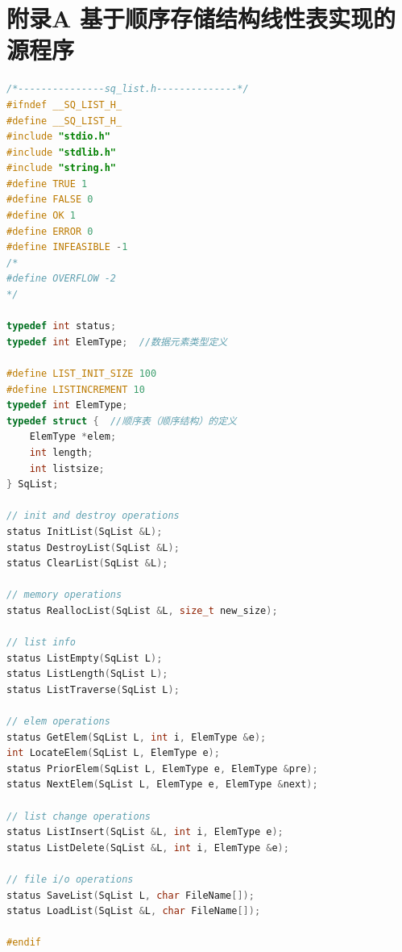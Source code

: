 \documentclass[supercite]{Experimental_Report}
\theoremstyle{definition}
\begin{document}


\appendix

\section{附录A 基于顺序存储结构线性表实现的源程序}

\begin{lstlisting}[caption={$sq\_list.h$}, language=C++, frame=single]
/*---------------sq_list.h--------------*/
#ifndef __SQ_LIST_H_
#define __SQ_LIST_H_
#include "stdio.h"
#include "stdlib.h"
#include "string.h"
#define TRUE 1
#define FALSE 0
#define OK 1
#define ERROR 0
#define INFEASIBLE -1
/*
#define OVERFLOW -2
*/

typedef int status;
typedef int ElemType;  //数据元素类型定义

#define LIST_INIT_SIZE 100
#define LISTINCREMENT 10
typedef int ElemType;
typedef struct {  //顺序表（顺序结构）的定义
    ElemType *elem;
    int length;
    int listsize;
} SqList;

// init and destroy operations
status InitList(SqList &L);
status DestroyList(SqList &L);
status ClearList(SqList &L);

// memory operations
status ReallocList(SqList &L, size_t new_size);

// list info
status ListEmpty(SqList L);
status ListLength(SqList L);
status ListTraverse(SqList L);

// elem operations
status GetElem(SqList L, int i, ElemType &e);
int LocateElem(SqList L, ElemType e);
status PriorElem(SqList L, ElemType e, ElemType &pre);
status NextElem(SqList L, ElemType e, ElemType &next);

// list change operations
status ListInsert(SqList &L, int i, ElemType e);
status ListDelete(SqList &L, int i, ElemType &e);

// file i/o operations
status SaveList(SqList L, char FileName[]);
status LoadList(SqList &L, char FileName[]);

#endif
\end{lstlisting}
\end{document}
